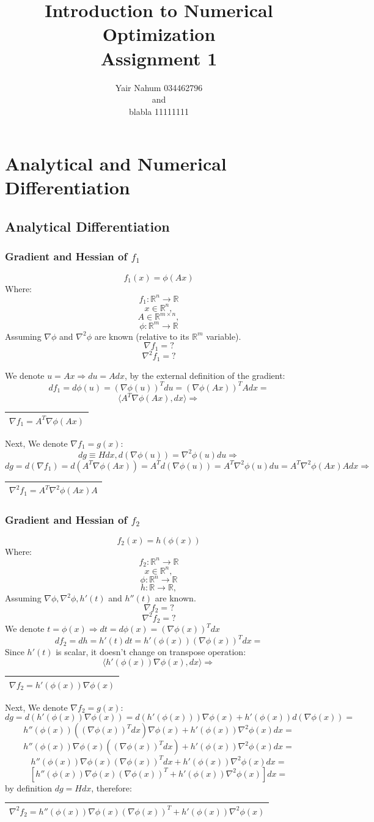 \documentclass[12pt]{article}
\title{Introduction to Numerical Optimization\\Assignment 1}
\author{Yair Nahum 034462796\\and\\blabla 11111111 }
\newcommand{\rectres}[1]{
\begin{center}
\begin{tabular}{ |c| }
\hline
 #1\\
\hline
\end{tabular}
\end{center}
}
\begin{document}
\maketitle


\section{Analytical and Numerical Differentiation}

\subsection{Analytical Differentiation}

\subsubsection{Gradient and Hessian of $f_1$}
$$f_1(x)=\phi(Ax)$$
Where:
$$f_1:\mathbb{R}^n \rightarrow \mathbb{R}$$
$$x \in \mathbb{R}^{n},$$
$$A \in \mathbb{R}^{m\times n},$$
$$\phi:\mathbb{R}^m \rightarrow \mathbb{R}$$
Assuming $\nabla\phi$ and $\nabla^2\phi$ are known (relative to its $\mathbb{R}^m$ variable).
$$\nabla f_1 = ?$$
$$\nabla^2 f_1 = ?$$

We denote $u=Ax \Rightarrow du=Adx$, by the external definition of the gradient:
$$df_1=d\phi(u)=(\nabla\phi(u))^T du = (\nabla\phi(Ax))^T A dx = $$
$$ \langle A^T\nabla \phi(Ax), dx \rangle \Rightarrow $$
\rectres{$\nabla f_1 = A^T\nabla \phi(Ax)$}
Next, We denote $\nabla f_1= g(x)$:
$$dg\equiv Hdx,d(\nabla \phi(u)) =  \nabla^2 \phi(u) du \Rightarrow$$
$$dg=d(\nabla f_1) = d(A^T\nabla \phi(Ax))=A^Td(\nabla \phi(u))=A^T\nabla^2 \phi(u) du = A^T\nabla^2 \phi(Ax) A dx \Rightarrow$$
\rectres{$\nabla^2 f_1 = A^T\nabla^2 \phi(Ax) A$}

\subsubsection{Gradient and Hessian of $f_2$}
$$f_2(x)=h(\phi(x))$$
Where:
$$f_2:\mathbb{R}^n \rightarrow \mathbb{R}$$
$$x \in \mathbb{R}^{n},$$
$$\phi:\mathbb{R}^n \rightarrow \mathbb{R}$$
$$h:\mathbb{R} \rightarrow \mathbb{R},$$
Assuming $\nabla\phi, \nabla^2\phi, h'(t)$ and $h''(t)$ are known.
$$\nabla f_2 = ?$$
$$\nabla^2 f_2 = ?$$
We denote $t=\phi(x)\Rightarrow dt=d\phi(x)=(\nabla \phi(x))^Tdx$
$$df_2= dh = h'(t)dt = h'(\phi(x))(\nabla \phi(x))^Tdx=$$
Since $h'(t)$ is scalar, it doesn't change on transpose operation:
$$\langle h'(\phi(x))\nabla \phi(x), dx \rangle \Rightarrow$$
\rectres{$\nabla f_2 = h'(\phi(x))\nabla \phi(x)$}
Next, We denote $\nabla f_2= g(x)$:
$$dg = d(h'(\phi(x))\nabla \phi(x)) =  d(h'(\phi(x)))\nabla \phi(x) + h'(\phi(x))d(\nabla \phi(x))=$$
$$h''(\phi(x))((\nabla \phi(x))^Tdx)\nabla \phi(x) + h'(\phi(x))\nabla^2 \phi(x)dx=$$
$$h''(\phi(x))\nabla \phi(x)((\nabla \phi(x))^Tdx) + h'(\phi(x))\nabla^2 \phi(x)dx=$$
$$h''(\phi(x))\nabla \phi(x)(\nabla \phi(x))^Tdx + h'(\phi(x))\nabla^2 \phi(x)dx=$$
$$[h''(\phi(x))\nabla \phi(x)(\nabla \phi(x))^T + h'(\phi(x))\nabla^2 \phi(x)]dx=$$
by definition $dg=Hdx$, therefore:
\rectres{$\nabla^2 f_2 = h''(\phi(x))\nabla \phi(x)(\nabla \phi(x))^T + h'(\phi(x))\nabla^2 \phi(x)$}
\newpage
\end{document}
